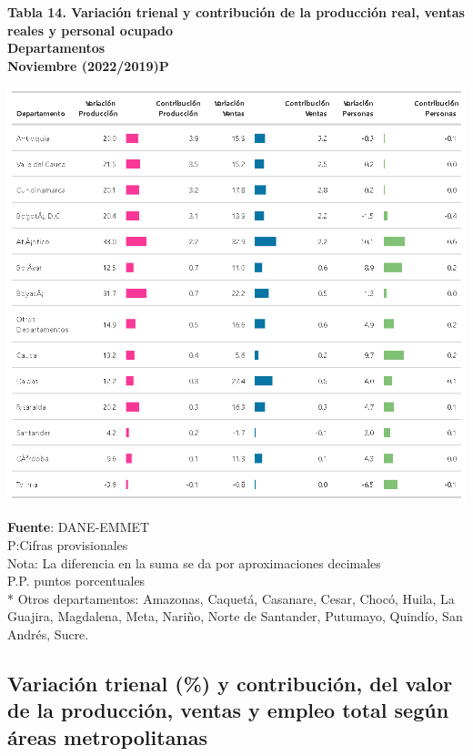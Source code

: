 \documentclass[
]{article}
\begin{document}
\textbf{Tabla 14. Variación trienal y contribución de la producción real, ventas reales y personal ocupado}\\
\textbf{Departamentos}\\
\textbf{Noviembre (2022/2019)P}\\

\begin{center}\includegraphics[width=12.58in]{tabla14_1} \end{center}

\textbf{Fuente}: DANE-EMMET\\
P:Cifras provisionales\\
Nota: La diferencia en la suma se da por aproximaciones decimales\\
P.P. puntos porcentuales\\
* Otros departamentos: Amazonas, Caquetá, Casanare, Cesar, Chocó, Huila,
La Guajira, Magdalena, Meta, Nariño, Norte de Santander, Putumayo,
Quindío, San Andrés, Sucre.\\

\hypertarget{variaciuxf3n-trienal-y-contribuciuxf3n-del-valor-de-la-producciuxf3n-ventas-y-empleo-total-seguxfan-uxe1reas-metropolitanas}{%
\subsection{Variación trienal (\%) y contribución, del valor de la
producción, ventas y empleo total según áreas
metropolitanas}\label{variaciuxf3n-trienal-y-contribuciuxf3n-del-valor-de-la-producciuxf3n-ventas-y-empleo-total-seguxfan-uxe1reas-metropolitanas}}
\end{document}
